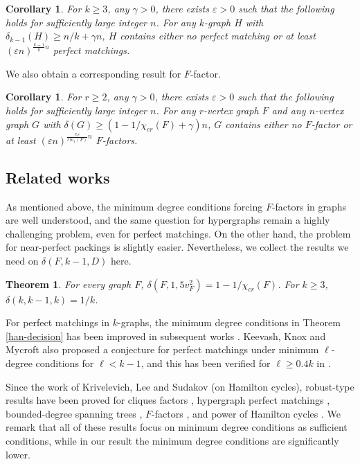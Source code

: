 \documentclass[11pt, letterpaper]{amsart}
\theoremstyle{plain}
\numberwithin{equation}{section}
\newtheorem{theorem}[thm]{Theorem}
\newtheorem{corollary}[thm]{Corollary}
\theoremstyle{definition}
\newcommand{\red}{\textcolor[rgb]{1.00,0.00,0.00}}
\begin{document}
     \begin{corollary}\label{count result-Pm}
        For $ k\ge 3 $, any $ \gamma > 0 $, there exists $\varepsilon>0$ such that the following holds for sufficiently large integer $n$. 
        For any $k$-graph $H$ with $\delta_{k-1}(H)\ge n/k+\gamma n$, $H$ contains either no perfect matching or at least $(\varepsilon n)^{\frac{k-1}{k}n}$ perfect matchings.
    \end{corollary}
    
    We also obtain a corresponding result for \(F\)-factor.

    \begin{corollary}\label{count result-packing}
    For $ r\ge 2 $, any $ \gamma > 0 $, there exists $\varepsilon>0$ such that the following holds for sufficiently large integer $n$. 
    For any $r$-vertex graph $F$ and any $n$-vertex graph $G$ with $\delta(G)\ge (1-1/{\chi}_{cr}(F)+\gamma )n$, $G$ contains either no $F$-factor or at least $(\varepsilon n)^{\frac{e_F}{rm_1(F)}n}$ $F$-factors.
    \end{corollary}


\subsection{Related works}

As mentioned above, the minimum degree conditions forcing $F$-factors in graphs are well understood, and the same question for hypergraphs remain a highly challenging problem, even for perfect matchings.
On the other hand, the problem for near-perfect packings is slightly easier.
Nevertheless, we collect the results we need on $\delta(F, k-1, D)$ here.
\begin{theorem}
\cite{shokoufandeh2003proof, han2015near} %
\label{thm:deltaFD}
For every graph $F$, $\delta(F, 1, 5v_F^2)=1-1/\chi_{cr}(F)$.
For $k\ge 3$, $\delta(k, k-1, k)=1/k$.
\end{theorem}

For perfect matchings in $k$-graphs, the minimum degree conditions in Theorem \ref{han-decision} has been improved in subsequent works \cite{han2017decision, han2020finding}.
Keevash, Knox and Mycroft also proposed a conjecture for perfect matchings under minimum $\ell$-degree conditions for $\ell < k-1$, and this has been verified for $\ell\ge 0.4k$ in \cite{han2020complexity, gan2025keevash}.%

Since the work of Krivelevich, Lee and Sudakov (on Hamilton cycles), robust-type results have been proved for cliques factors \cite{allen2024robust, pham2022toolkit}, hypergraph perfect matchings \cite{pham2022toolkit}, bounded-degree spanning trees \cite{pham2022toolkit}, $F$-factors \cite{kelly2024optimal}, and power of Hamilton cycles \cite{joos2023robust}. We remark that all of these results focus on minimum degree conditions as sufficient conditions, while in our result the minimum degree conditions are significantly lower. 
\end{document}
